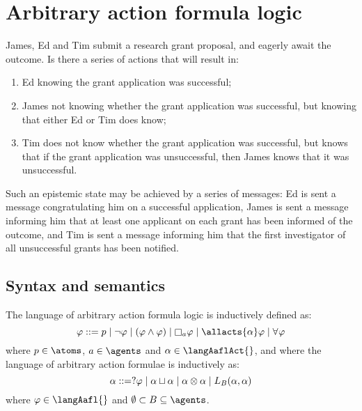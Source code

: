 \chapter{Arbitrary action formula logic}\label{aafl}

\begin{example}\label{grant-example}
James, Ed and Tim submit a research grant proposal, and eagerly await the outcome.
Is there a series of actions that will result in: 

\begin{enumerate}
  \item Ed knowing the grant application was successful; 
  \item James not knowing whether the grant application was successful, but knowing that either Ed or Tim does know;
  \item Tim does not know whether the grant application was successful, but knows that if the grant application was unsuccessful, then James knows that it was unsuccessful.
\end{enumerate}

Such an epistemic state may be achieved by a series of messages: Ed is sent a message congratulating him on a successful application, James is sent a message informing him that at least one applicant on each grant has been informed of the outcome, and Tim is sent a message informing him that the first investigator of all unsuccessful grants has been notified.
\end{example}

\section{Syntax and semantics}\label{aafl-semantics}

\begin{definition}
The language \langAafl{} of arbitrary action formula logic is inductively defined as:
$$
    \phi ::= \atomP \mid 
           \neg \phi \mid
           (\phi \land \phi) \mid
           \necessary[\agentA] \phi \mid
           \allacts{\alpha} \phi \mid
           \allrefs \phi
$$
where $\atomP \in \atoms$, $\agentA \in \agents$ and $\alpha \in \langAaflAct{}$, and where the language \langAaflAct{} of arbitrary action formulae is inductively as:
$$
    \alpha ::= ?{\varphi} \mid
           \alpha \sqcup \alpha \mid
           \alpha \otimes \alpha \mid
           L_B (\alpha, \alpha)
$$
where $\phi \in \langAafl{}$ and $\emptyset \subset \agentsB \subseteq \agents$.
\end{definition}

